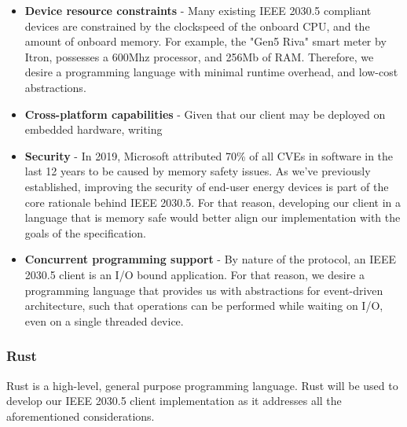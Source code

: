 \begin{itemize}
    \item \textbf{Device resource constraints} - Many existing IEEE 2030.5 compliant devices are constrained by the clockspeed of the onboard CPU, and the amount of onboard memory.
    For example, the "Gen5 Riva" smart meter by Itron, possesses a 600Mhz processor, and 256Mb of RAM. \cite[]{Gen5Riva}
    \hfill \break
    Therefore, we desire a programming language with minimal runtime overhead, and low-cost abstractions.
    \item \textbf{Cross-platform capabilities} - Given that our client may be deployed on embedded hardware, writing \item \textbf{Security} - In 2019, Microsoft attributed 70\% of all CVEs in software in the last 12 years to be caused by memory safety issues. \cite[]{SecurityMemorySafety}
    As we've previously established, improving the security of end-user energy devices is part of the core rationale behind IEEE 2030.5. For that reason, developing our client in a language that is memory safe would better align our implementation with the goals of the specification.
    \item \textbf{Concurrent programming support} - By nature of the protocol, an IEEE 2030.5 client is an I/O bound application. For that reason, we desire a programming language that provides us with abstractions for event-driven architecture, such that operations can be performed while waiting on I/O, even on a single threaded device.
\end{itemize}


\subsubsection{Rust}
Rust is a high-level, general purpose programming language.
Rust will be used to develop our IEEE 2030.5 client implementation as it addresses all the aforementioned considerations.

